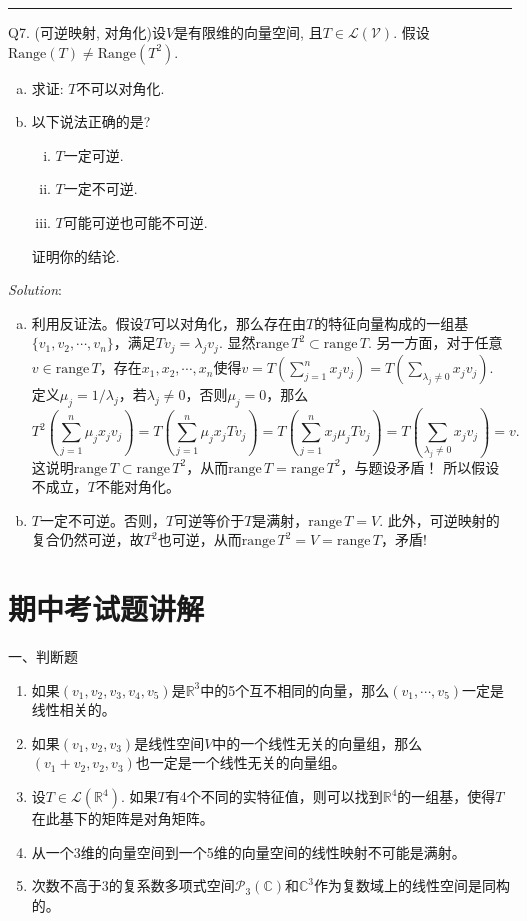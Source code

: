 \documentclass[a4[paper]{article}
\newcommand\R{\mathbb{R}}  %
\def\range{\mathrm{range}\,}
\begin{document}
\bigskip
\noindent{}\rule{\textwidth}{0.1mm}
\bigskip

\noindent{}Q7. (可逆映射, 对角化)设$V$是有限维的向量空间, 且$T\in \mathcal{L(V)}$. 假设$\mathrm{Range}(T) \not = \mathrm{Range}(T^2)$.
\begin{enumerate}[(a).]
	\item 求证: $T$不可以对角化.
	\item 以下说法正确的是?
	\begin{enumerate}[(i)..]
		\item $T$一定可逆.
		\item $T$一定不可逆.
		\item $T$可能可逆也可能不可逆.
	\end{enumerate}
	证明你的结论.
	\end{enumerate}
	
\noindent{}\emph{Solution}:
\begin{enumerate}[(a).]
	\item 利用反证法。假设$T$可以对角化，那么存在由$T$的特征向量构成的一组基$\{v_1,v_2,\cdots,v_n\}$，满足$Tv_j = \lambda_j v_j$. 显然$\range T^2\subset \range T$. 另一方面，对于任意$v\in\range T$，存在$x_1,x_2,\cdots,x_n$使得$v = T(\sum_{j=1}^nx_j v_j) = T(\sum_{\lambda_j\ne 0}x_j v_j)$. 定义$\mu_j = 1/\lambda_j$，若$\lambda_j\ne 0$，否则$\mu_j=0$，那么
\[T^2(\sum_{j=1}^n\mu_jx_jv_j) = T(\sum_{j=1}^n\mu_jx_j Tv_j) = T(\sum_{j=1}^nx_j \mu_jTv_j) = T(\sum_{\lambda_j\ne 0} x_jv_j) = v.\]
这说明$\range T\subset \range T^2$，从而$\range T= \range T^2$，与题设矛盾！ 所以假设不成立，$T$不能对角化。

	\item $T$一定不可逆。否则，$T$可逆等价于$T$是满射，$\range T=V$. 此外，可逆映射的复合仍然可逆，故$T^2$也可逆，从而$\range T^2=V=\range T$，矛盾!

\end{enumerate}

\section{期中考试题讲解}

\noindent{} 一、判断题
\begin{enumerate}[1.]
\item 如果$(v_1,v_2,v_3,v_4,v_5)$是$\R^3$中的5个互不相同的向量，那么$(v_1,\cdots,v_5)$一定是线性相关的。
\item 如果$(v_1,v_2,v_3)$是线性空间$V$中的一个线性无关的向量组，那么$(v_1+v_2,v_2,v_3)$也一定是一个线性无关的向量组。
\item 设$T\in\mathcal{L}(\R^4)$. 如果$T$有4个不同的实特征值，则可以找到$\R^4$的一组基，使得$T$在此基下的矩阵是对角矩阵。
\item 从一个3维的向量空间到一个5维的向量空间的线性映射不可能是满射。
\item 次数不高于3的复系数多项式空间$\mathcal{P}_3(\mathbb{C})$和$\mathbb{C}^3$作为复数域上的线性空间是同构的。
\end{enumerate}
\end{document}

